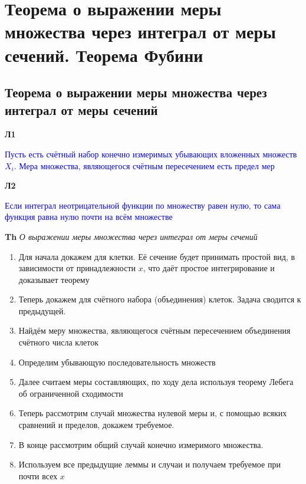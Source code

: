 \documentclass[a4paper, 14pt]{article}
\begin{document}
    
    \tableofcontents \newpage
    
    \section{Теорема о выражении меры множества через интеграл от меры сечений.
    Теорема Фубини}
    
    \subsection{Теорема о выражении меры множества через интеграл от меры сечений}
    
    \textbf{Л1}
    
    \textcolor{blue}{Пусть есть счётный набор конечно измеримых убывающих вложенных множеств $X_i$.
    Мера множества, являющегося счётным пересечением есть предел мер}
    
    \textbf{Л2}
    
    \textcolor{blue}{Если интеграл неотрицательной функции по множеству равен нулю, то сама функция равна нулю почти
    на всём множестве}
    
    \textbf{Th} \textit{О выражении меры множества через интеграл от меры сечений}
    
    \begin{enumerate}
        \item Для начала докажем для клетки.
        Её сечение будет принимать простой вид, в зависимости от принадлежности $x$, что даёт простое
        интегрирование и доказывает теорему
        \item Теперь докажем для счётного набора (объединения) клеток.
        Задача сводится к предыдущей.
        \item Найдём меру множества, являющегося счётным пересечением объединения счётного числа клеток
        \item Определим убывающую последовательность множеств
        \item Далее считаем меры составляющих, по ходу дела используя теорему Лебега об ограниченной сходимости
        \item Теперь рассмотрим случай множества нулевой меры и, с помощью всяких сравнений и пределов, докажем
        требуемое.
        \item В конце рассмотрим общий случай конечно измеримого множества.
        \item Используем все предыдущие леммы и случаи и получаем требуемое при почти всех $x$
    \end{enumerate}
    
\end{document}
